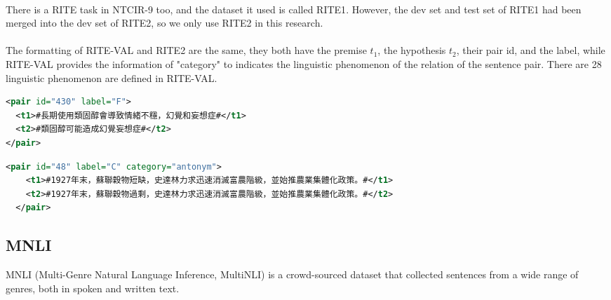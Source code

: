 \documentclass{article}
\begin{document}
\begin{CJK*}{UTF8}{bsmi}
\paragraph{}
There is a RITE task in NTCIR-9 too, and the dataset it used is called RITE1\cite{ntcir9rite1}. However, the dev set and test set of RITE1 had been merged into the dev set of RITE2, so we only use RITE2 in this research.

\paragraph{}
The formatting of RITE-VAL and RITE2 are the same, they both have the premise $t_1$, the hypothesis $t_2$, their pair id, and the label, while RITE-VAL provides the information of "category" to indicates the linguistic phenomenon of the relation of the sentence pair. There are 28 linguistic phenomenon are defined in RITE-VAL.

\begin{lstlisting}[language=XML, caption=Example of RITE2]
<pair id="430" label="F">
  <t1>#長期使用類固醇會導致情緒不穩，幻覺和妄想症#</t1>
  <t2>#類固醇可能造成幻覺妄想症#</t2>
</pair>
\end{lstlisting}

\begin{lstlisting}[language=XML, caption=Example of RITE-VAL]
  <pair id="48" label="C" category="antonym">
    <t1>#1927年末，蘇聯穀物短缺，史達林力求迅速消滅富農階級，並始推農業集體化政策。#</t1>
    <t2>#1927年末，蘇聯穀物過剩，史達林力求迅速消滅富農階級，並始推農業集體化政策。#</t2>
  </pair>
\end{lstlisting}

\subsection{MNLI}
MNLI (Multi-Genre Natural Language Inference, MultiNLI) is a crowd-sourced dataset that collected sentences from a wide range of genres, both in spoken and written text.


\end{CJK*}
\end{document}
